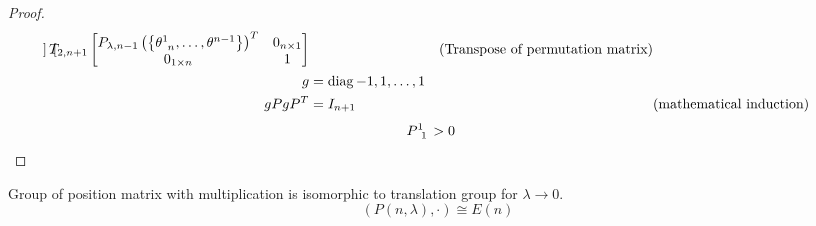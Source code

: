 \documentclass[../main.tex]{subfiles}
\begin{document}
\begin{proof}
\begin{align*}
\begin{bmatrix}
\end{bmatrix}
T_{2,n+1}
\begin{bmatrix}
P_{\lambda,n-1}\left(\left\{\tensor{\theta}{^1_{n}},\dots,\tensor{\theta}{^{n-1}}\right\}\right)^T&0_{n\times 1}\\
0_{1\times n}&1\\
\end{bmatrix}
&&\text{(Transpose of permutation matrix)}\\
g
&=\diag{-1,1,\dots,1}\\
gPgP^T
&=I_{n+1}&&\text{(mathematical induction)}
\end{align*}
\begin{align*}
\tensor{P}{^1_1}&> 0
\end{align*}
\end{proof}
\begin{proposition}
Group of position matrix with multiplication is isomorphic to translation group for \(\lambda\to0\).
\[
\left(P\left(n,\lambda\right),\cdot\right)\cong E\left(n\right)
\]
\end{proposition}
\end{document}
